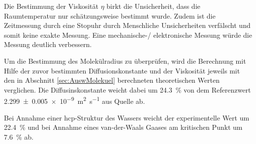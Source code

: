 Die Bestimmung der Viskosität $\eta$ birkt die Unsicherheit, dass die Raumtemperatur
nur schätzungsweise bestimmt wurde. Zudem ist die Zeitmessung durch eine Stopuhr durch
Menschliche Unsicherheiten verfälscht und somit keine exakte Messung. Eine mechanische-/
elektronische Messung würde die Messung deutlich verbessern.

Um die Bestimmung des Molekülradius zu überprüfen, wird die Berechnung mit Hilfe der zuvor
bestimmten Diffusionskonstante und der Viskosität jeweils mit den
in Abschnitt \ref{sec:AuswMolekuel} berechneten theoretischen Werten verglichen.
Die Diffusinskonstante weicht dabei um \SI{24.3}{\percent} von dem Referenzwert
\SI{2.299(5)e-9}{\square\meter \per \second} aus Quelle \cite{B005319H} ab.

Bei Annahme einer hcp-Struktur des Wassers weicht der experimentelle Wert
um \SI{22.4}{\percent} und bei Annahme eines
van-der-Waals Gaases am kritischen Punkt um \SI{7.6}{\percent} ab.
